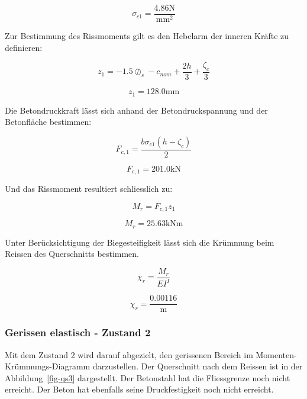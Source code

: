 \documentclass[
  12pt,
  letterpaper,
  egregdoesnotlikesansseriftitles]{scrreprt}
\begin{document}
\begin{equation}\sigma_{c 1} = \frac{4.86 \text{N}}{\text{mm}^{2}}\end{equation}

Zur Bestimmung des Rissmoments gilt es den Hebelarm der inneren Kräfte
zu definieren:

\begin{equation}z_{1} = - 1.5 \oslash_{s} - c_{nom} + \frac{2 h}{3} + \frac{\zeta_{c}}{3}\end{equation}

\begin{equation}z_{1} = 128.0 \text{mm}\end{equation}

Die Betondruckkraft lässt sich anhand der Betondruckspannung und der
Betonfläche bestimmen:

\begin{equation}F_{c,1} = \frac{b \sigma_{c 1} \left(h - \zeta_{c}\right)}{2}\end{equation}

\begin{equation}F_{c,1} = 201.0 \text{kN}\end{equation}

Und das Rissmoment resultiert schliesslich zu:

\begin{equation}M_{r} = F_{c,1} z_{1}\end{equation}

\begin{equation}M_{r} = 25.63 \text{kN} \text{m}\end{equation}

Unter Berücksichtigung der Biegesteifigkeit lässt sich die Krümmung beim
Reissen des Querschnitts bestimmen.

\begin{equation}\chi_{r} = \frac{M_{r}}{EI^{I}}\end{equation}

\begin{equation}\chi_{r} = \frac{0.00116}{\text{m}}\end{equation}

\hypertarget{gerissen-elastisch---zustand-2}{%
\subsubsection{Gerissen elastisch - Zustand
2}\label{gerissen-elastisch---zustand-2}}

Mit dem Zustand 2 wird darauf abgezielt, den gerissenen Bereich im
Momenten-Krümmungs-Diagramm darzustellen. Der Querschnitt nach dem
Reissen ist in der Abbildung~\ref{fig-qs3} dargestellt. Der Betonstahl
hat die Fliessgrenze noch nicht erreicht. Der Beton hat ebenfalls seine
Druckfestigkeit noch nicht erreicht.
\end{document}
